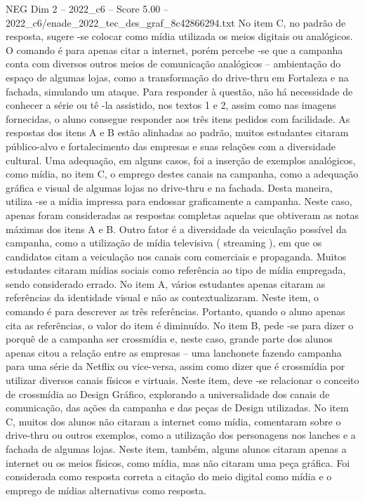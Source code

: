 \begin{textsample}{NEG Dim 2 – 2022\_c6 – Score 5.00 – 2022\_c6/enade\_2022\_tec\_des\_graf\_8c42866294.txt}
No item C, no padrão de resposta, sugere -se colocar como mídia utilizada os meios digitais ou analógicos.
O comando é para apenas citar a internet, porém percebe -se que a campanha conta com diversos outros meios de comunicação analógicos – ambientação do espaço de algumas lojas, como a transformação do drive-thru em Fortaleza e na fachada, simulando um ataque.
Para responder à questão, não há necessidade de conhecer a série ou tê -la assistido, nos textos 1 e 2, assim como nas imagens fornecidas, o aluno consegue responder aos três itens pedidos com facilidade.
As respostas dos itens A e B estão alinhadas ao padrão, muitos estudantes citaram público-alvo e fortalecimento das empresas e suas relações com a diversidade cultural.
Uma adequação, em alguns casos, foi a inserção de exemplos analógicos, como mídia, no item C, o emprego destes canais na campanha, como a adequação gráfica e visual de algumas lojas no drive-thru e na fachada.
Desta maneira, utiliza -se a mídia impressa para endossar graficamente a campanha.
Neste caso, apenas foram consideradas as respostas completas aquelas que obtiveram as notas máximas dos itens A e B.
Outro fator é a diversidade da veiculação possível da campanha, como a utilização de mídia televisiva ( streaming ), em que os candidatos citam a veiculação nos canais com comerciais e propaganda.
Muitos estudantes citaram mídias sociais como referência ao tipo de mídia empregada, sendo considerado errado.
No item A, vários estudantes apenas citaram as referências da identidade visual e não as contextualizaram.
Neste item, o comando é para descrever as três referências.
Portanto, quando o aluno apenas cita as referências, o valor do item é diminuído.
No item B, pede -se para dizer o porquê de a campanha ser crossmídia e, neste caso, grande parte dos alunos apenas citou a relação entre as empresas – uma lanchonete fazendo campanha para uma série da Netflix ou vice-versa, assim como dizer que é crossmídia por utilizar diversos canais físicos e virtuais.
Neste item, deve -se relacionar o conceito de crossmídia ao Design Gráfico, explorando a universalidade dos canais de comunicação, das ações da campanha e das peças de Design utilizadas.
No item C, muitos dos alunos não citaram a internet como mídia, comentaram sobre o drive-thru ou outros exemplos, como a utilização dos personagens nos lanches e a fachada de algumas lojas.
Neste item, também, alguns alunos citaram apenas a internet ou os meios físicos, como mídia, mas não citaram uma peça gráfica.
Foi considerada como resposta correta a citação do meio digital como mídia e o emprego de mídias alternativas como resposta.

\end{textsample}
